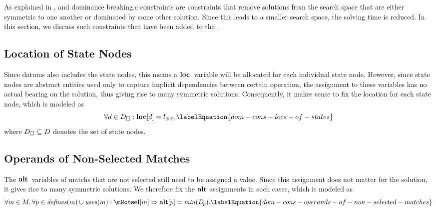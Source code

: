 As explained in ,  and \gls{dominance breaking.c} \glspl{constraint} are
\glspl{constraint} that remove \glspl{solution} from the \gls{search space} that
are either symmetric to one another or dominated by some other \gls{solution}.
%
Since this leads to a smaller \gls{search space}, the solving time is reduced.
%
In this section, we discuss such \glspl{constraint} that have been added to the
.


\subsection{Location of State Nodes}

Since \glspl{datum} also includes the \glspl{state node}, this means a
$\mVar{loc}$~\gls{variable} will be allocated for each individual \gls{state
  node}.
%
However, since \glspl{state node} are abstract entities used only to capture
implicit dependencies between certain \gls{operation}, the assignment to these
\glspl{variable} has no actual bearing on the \gls{solution}, thus giving rise
to many symmetric \glspl{solution}.
%
Consequently, it makes sense to fix the \gls{location} for each \gls{state
  node}, which is modeled as
%
\begin{equation}
  \forall d \in \mStateDataSet :
  \mVar{loc}[d] = \mIntLocation,
  \labelEquation{dom-cons-locs-of-states}
\end{equation}
%
where \mbox{$\mStateDataSet \subseteq \mDataSet$} denotes the set of
\glspl{state node}.


\subsection{Operands of Non-Selected Matches}

The $\mVar{alt}$~\glspl{variable} of \glspl{match} that are not selected still
need to be assigned a value.
%
Since this assignment does not matter for the \gls{solution}, it gives rise to
many symmetric \glspl{solution}.
%
We therefore fix the $\mVar{alt}$ assignments in such cases, which is modeled as
%
\begin{equation}
  \forall m \in \mMatchSet,
  \forall p \in \mDefines(m) \cup \mUses(m) :
  \mNot\mVar{sel}[m] \mImp \mVar{alt}[p] = \mMin(\mDataSet[\hspace{-1pt}p]).
  \labelEquation{dom-cons-operands-of-non-selected-matches}
\end{equation}

